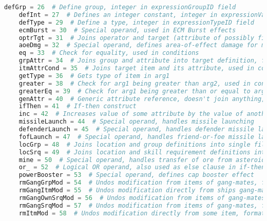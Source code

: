 \begin{lstlisting}[language=python, caption=Dogma operands]
    defGrp = 26  # Define group, integer in expressionGroupID field
    defInt = 27  # Defines an integer constant, integer in expressionValue field
    defType = 29  # Define a type, integer in expressionTypeID field
    ecmBurst = 30  # Special operand, used in ECM Burst effects
    optrTgt = 31  # Joins operator and target (attribute of possibly filtered items) definitions, format: (location->targetAttribute).(operator)
    aoeDmg = 32  # Special operand, defines area-of-effect damage for modules like smartbombs and old doomsday
    eq = 33  # Check for equality, used in conditions
    grpAttr = 34  # Joins group and attribute into target definition, format: groupFilter.targetAttribute
    itmAttrCond = 35  # Joins target item and its attribute, used in conditions
    getType = 36  # Gets type of item in arg1
    greater = 38  # Check for arg1 being greater than arg2, used in conditions
    greaterEq = 39  # Check for arg1 being greater than or equal to arg2, used in conditions
    genAttr = 40  # Generic attribute reference, doesn't join anything, just refers attribute definition
    ifThen = 41  # If-then construct
    inc = 42  # Increases value of some attribute by the value of another one
    missileLaunch = 44  # Special operand, handles missile launching
    defenderLaunch = 45  # Special operand, handles defender missile launching
    fofLaunch = 47  # Special operand, handles friend-or-foe missile launching
    locGrp = 48  # Joins location and group definitions into single filter, format: location..group
    locSrq = 49  # Joins location and skill requirement definitions into single filter, format: location[skillRequirement]
    mine = 50  # Special operand, handles transfer of ore from asteroid to cargo
    or_ = 52  # Logical OR operand, also used as else clause in if-then constructions
    powerBooster = 53  # Special operand, defines cap booster effect
    rmGangGrpMod = 54  # Undos modification from items of gang-mates, filtered by group, format: [(groupFilter.targetAttribute).(operator)].RGGM(sourceAttribute)
    rmGangItmMod = 55  # Undos modification directly from ships gang-mates, format: ((targetAttribute).(operator)).RGIM(sourceAttribute)
    rmGangOwnSrqMod = 56  # Undos modification from items of gang-mates, filtered by owner and skill requirement
    rmGangSrqMod = 57  # Undos modification from items of gang-mates, filtered by skill requirement, format: (skillRequirement.targetAttribute).(operator)).RGRSM(sourceAttribute))
    rmItmMod = 58  # Undos modification directly from some item, format: ((location->targetAttribute).(operator)).RIM(sourceAttribute)

\end{lstlisting}

